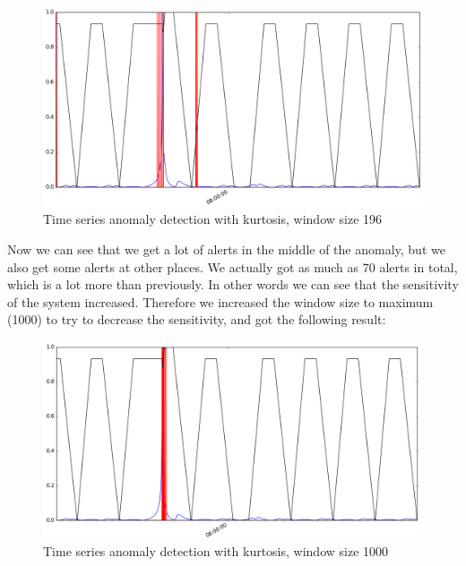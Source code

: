 \documentclass[english, a4paper]{report}
\begin{document}
{{{            \begin{figure}[H]
                \centering
                \includegraphics[width=\textwidth]{Kurtosis-Window-196}
                \caption{Time series anomaly detection with kurtosis, window size 196}
                \label{fig:timeSeriesADKurtosisWindow196}
            \end{figure}
            
            Now we can see that we get a lot of alerts in the middle of the anomaly, but we also get some alerts at other places. We actually got as much as 70 alerts in total, which is a lot more than previously. In other words we can see that the sensitivity of the system increased. Therefore we increased the window size to maximum (1000) to try to decrease the sensitivity, and got the following result:
            
            \begin{figure}[H]
                \centering
                \includegraphics[width=\textwidth]{Kurtosis-Window-1000}
                \caption{Time series anomaly detection with kurtosis, window size 1000}
                \label{fig:timeSeriesADKurtosisWindow1000}
            \end{figure}
            
}}}
\end{document}
